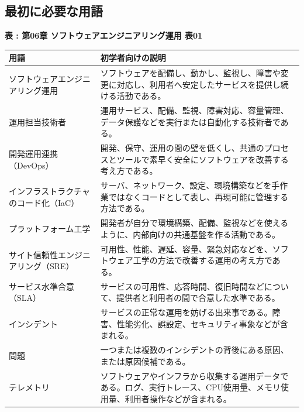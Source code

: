 \subsection*{最初に必要な用語}

\par\smallskip\noindent{}\label{tab:ch06-01}\textbf{表 \thetable: 第06章 ソフトウェアエンジニアリング運用 表01}\par\smallskip
\begin{longtable}{L{35mm}L{115mm}}
\toprule
用語 & 初学者向けの説明 \\
\midrule
ソフトウェアエンジニアリング運用 & ソフトウェアを配備し、動かし、監視し、障害や変更に対応し、利用者へ安定したサービスを提供し続ける活動である。 \\
運用担当技術者 & 運用サービス、配備、監視、障害対応、容量管理、データ保護などを実行または自動化する技術者である。 \\
開発運用連携（DevOps） & 開発、保守、運用の間の壁を低くし、共通のプロセスとツールで素早く安全にソフトウェアを改善する考え方である。 \\
インフラストラクチャのコード化（IaC） & サーバ、ネットワーク、設定、環境構築などを手作業ではなくコードとして表し、再現可能に管理する方法である。 \\
プラットフォーム工学 & 開発者が自分で環境構築、配備、監視などを使えるように、内部向けの共通基盤を作る活動である。 \\
サイト信頼性エンジニアリング（SRE） & 可用性、性能、遅延、容量、緊急対応などを、ソフトウェア工学の方法で改善する運用の考え方である。 \\
サービス水準合意（SLA） & サービスの可用性、応答時間、復旧時間などについて、提供者と利用者の間で合意した水準である。 \\
インシデント & サービスの正常な運用を妨げる出来事である。障害、性能劣化、誤設定、セキュリティ事象などが含まれる。 \\
問題 & 一つまたは複数のインシデントの背後にある原因、または原因候補である。 \\
テレメトリ & ソフトウェアやインフラから収集する運用データである。ログ、実行トレース、CPU使用量、メモリ使用量、利用者操作などが含まれる。 \\
\bottomrule
\end{longtable}
